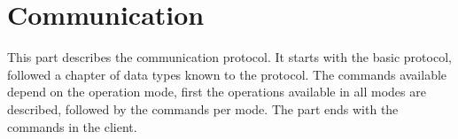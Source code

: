 \part{Communication}
\label{part:communication}

This part describes the communication protocol. It starts with the basic
protocol, followed a chapter of data types known to the protocol. The
commands available depend on the operation mode, first the operations
available in all modes are described, followed by the commands per mode.
The part ends with the commands in the client.


%
%
%
%
%
%
%
%
%
%
%
